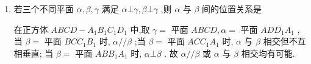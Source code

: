 \begin{enumerate}
\begin{jieda}
    选项 (A) 正确,证明如下: $a//b,a\bot \alpha ,\therefore b\bot \alpha$ ,又 $b \subset  \beta$ ,由两个平面垂直的判定定理, $\alpha \bot \beta$ ; 选项 (B) 错误, 反例: 在正方体 ${ABCD} - {A}_{1}{B}_{1}{C}_{1}{D}_{1}$ 中,取 $\alpha  =$ 平面 ${ABCD},a = {A}_{1}{B}_{1},b = {C}_{1}{D}_{1},c = {AD}$ ,则 $b//\alpha$ ; 选项 (C) 错误; 选项 (D) 错误,遗漏了 ${a}^{\prime }$ 与 ${b}^{\prime }$ 重合的可能性.
    \end{jieda}
    \item 若三个不同平面 $\alpha ,\beta ,\gamma$ 满足 $\alpha  \bot  \gamma ,\beta  \bot  \gamma$ ,则 $\alpha$ 与 $\beta$ 间的位置关系是 
    \begin{jieda}
        在正方体 ${ABCD} - {A}_{1}{B}_{1}{C}_{1}{D}_{1}$ 中,取 $\gamma  =$ 平面 ${ABCD},\alpha  =$ 平面 ${AD}{D}_{1}{A}_{1}$ ,当 $\beta  =$ 平面 ${BC}{C}_{1}{B}_{1}$ 时, $\alpha //\beta$ ;当 $\beta  =$ 平面 ${AC}{C}_{1}{A}_{1}$ 时, $\alpha$ 与 $\beta$ 相交但不互相垂直; 当 $\beta  =$ 平面 ${AB}{B}_{1}{A}_{1}$ 时, $\alpha  \bot  \beta$ . 故 $\alpha //\beta$ 或 $\alpha$ 与 $\beta$ 相交均有可能.
    \end{jieda}
    

\end{enumerate}
